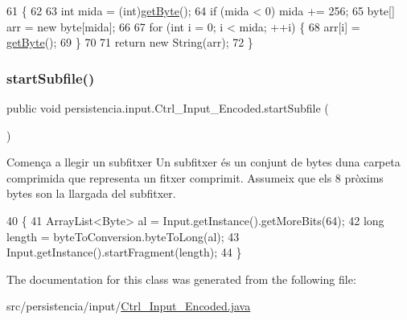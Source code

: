 \begin{DoxyCode}
61                             \{
62         
63         \textcolor{keywordtype}{int} mida = (int)\hyperlink{classpersistencia_1_1input_1_1Ctrl__Input__Encoded_a38ede6bc49251e77ae4be30ccc06457d}{getByte}();
64         \textcolor{keywordflow}{if} (mida < 0) mida += 256;
65         byte[] arr = \textcolor{keyword}{new} byte[mida];
66 
67         \textcolor{keywordflow}{for} (\textcolor{keywordtype}{int} i = 0; i < mida; ++i) \{
68             arr[i] = \hyperlink{classpersistencia_1_1input_1_1Ctrl__Input__Encoded_a38ede6bc49251e77ae4be30ccc06457d}{getByte}();
69         \}
70 
71         \textcolor{keywordflow}{return} \textcolor{keyword}{new} String(arr);
72     \}
\end{DoxyCode}
\mbox{\label{classpersistencia_1_1input_1_1Ctrl__Input__Encoded_ababb8ac0798194f61c4a77d1ddf5947e}} 
\subsubsection{\texorpdfstring{start\+Subfile()}{startSubfile()}}
{\footnotesize\ttfamily public void persistencia.\+input.\+Ctrl\+\_\+\+Input\+\_\+\+Encoded.\+start\+Subfile (\begin{DoxyParamCaption}{ }\end{DoxyParamCaption})\hspace{0.3cm}{\ttfamily [inline]}}



Comença a llegir un subfitxer Un subfitxer és un conjunt de bytes d\textquotesingle{}una carpeta comprimida que representa un fitxer comprimit. Assumeix que els 8 pròxims bytes son la llargada del subfitxer. 


\begin{DoxyCode}
40                                \{
41         ArrayList<Byte> al = Input.getInstance().getMoreBits(64);
42         \textcolor{keywordtype}{long} length = byteToConversion.byteToLong(al);
43         Input.getInstance().startFragment(length);
44     \}
\end{DoxyCode}


The documentation for this class was generated from the following file\+:\begin{DoxyCompactItemize}
\item 
src/persistencia/input/\hyperlink{Ctrl__Input__Encoded_8java}{Ctrl\+\_\+\+Input\+\_\+\+Encoded.\+java}\end{DoxyCompactItemize}
